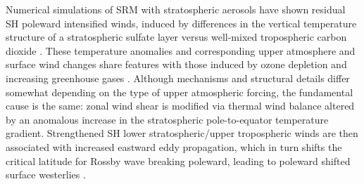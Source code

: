 \documentclass[draft,grl]{AGUTeX}  %
\begin{document}
\begin{article}
%
%


Numerical simulations of SRM with stratospheric aerosols have shown residual SH poleward intensified winds, induced by differences in the vertical temperature structure of a stratospheric sulfate layer versus well-mixed tropospheric carbon dioxide \citep{ammann10,mccusker12}. These temperature anomalies and corresponding upper atmosphere and surface wind changes share features with those induced by ozone depletion \citep{gillett03,gillett13,sigmond11,thompson11} and increasing greenhouse gases \citep{gillett13,sigmond11,polvani11}. Although mechanisms and structural details differ somewhat depending on the type of upper atmospheric forcing, the fundamental cause is the same: zonal wind shear is modified via thermal wind balance altered by an anomalous increase in the stratospheric pole-to-equator temperature gradient. Strengthened SH lower stratospheric/upper tropospheric winds are then associated with increased eastward eddy propagation, which in turn shifts the critical latitude for Rossby wave breaking poleward, leading to poleward shifted surface westerlies \citep{chen07}.%


\end{article}
\end{document}
